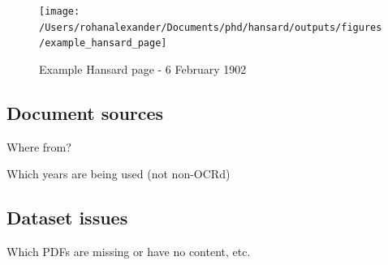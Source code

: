 \documentclass[12pt,]{article}
\theoremstyle{definition}
\theoremstyle{definition}
\theoremstyle{definition}
\theoremstyle{remark}
\begin{document}
\begin{figure}
\texttt{[image: /Users/rohanalexander/Documents/phd/hansard/outputs/figures/example\_hansard\_page]} \caption{Example Hansard page - 6 February 1902}\label{fig:unnamed-chunk-1}
\end{figure}

\subsection{Document sources}\label{document-sources}

Where from?

Which years are being used (not non-OCRd)

\subsection{Dataset issues}\label{dataset-issues}

Which PDFs are missing or have no content, etc.
\end{document}
